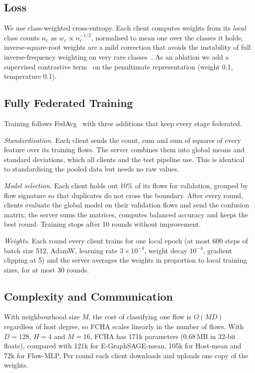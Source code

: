 \documentclass[journal]{IEEEtran}
\begin{document}
\subsection{Loss}
We use class-weighted cross-entropy. Each client computes weights from its \emph{local} class counts $n_c$ as $w_c\propto n_c^{-1/2}$, normalised to mean one over the classes it holds; inverse-square-root weights are a mild correction that avoids the instability of full inverse-frequency weighting on very rare classes~\cite{johnson2019imbalance,cui2019classbalanced}. As an ablation we add a supervised contrastive term~\cite{khosla2020supcon} on the penultimate representation (weight 0.1, temperature 0.1).

\subsection{Fully Federated Training}
\label{sec:fed}
Training follows FedAvg~\cite{mcmahan2017fedavg} with three additions that keep every stage federated.

\emph{Standardisation.} Each client sends the count, sum and sum of squares of every feature over its training flows. The server combines them into global means and standard deviations, which all clients and the test pipeline use. This is identical to standardising the pooled data but needs no raw values.

\emph{Model selection.} Each client holds out 10\% of its flows for validation, grouped by flow signature so that duplicates do not cross the boundary. After every round, clients evaluate the global model on their validation flows and send the confusion matrix; the server sums the matrices, computes balanced accuracy and keeps the best round. Training stops after 10 rounds without improvement.

\emph{Weights.} Each round every client trains for one local epoch (at most 600 steps of batch size 512, AdamW, learning rate $3\times10^{-4}$, weight decay $10^{-4}$, gradient clipping at 5) and the server averages the weights in proportion to local training sizes, for at most 30 rounds.

\subsection{Complexity and Communication}
With neighbourhood size $M$, the cost of classifying one flow is $O(M D)$ regardless of host degree, so FCHA scales linearly in the number of flows. With $D=128$, $H=4$ and $M=16$, FCHA has 171k parameters (0.68\,MB in 32-bit floats), compared with 121k for E-GraphSAGE-mean, 105k for Host-mean and 72k for Flow-MLP. Per round each client downloads and uploads one copy of the weights.
\end{document}
